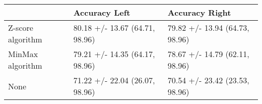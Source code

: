 \begin{tabular}{lll}
\toprule
{} &                   Accuracy Left &                  Accuracy Right \\
\midrule
Z-score algorithm &  80.18 +/- 13.67 (64.71, 98.96) &  79.82 +/- 13.94 (64.73, 98.96) \\
MinMax algorithm  &  79.21 +/- 14.35 (64.17, 98.96) &  78.67 +/- 14.79 (62.11, 98.96) \\
None              &  71.22 +/- 22.04 (26.07, 98.96) &  70.54 +/- 23.42 (23.53, 98.96) \\
\bottomrule
\end{tabular}
